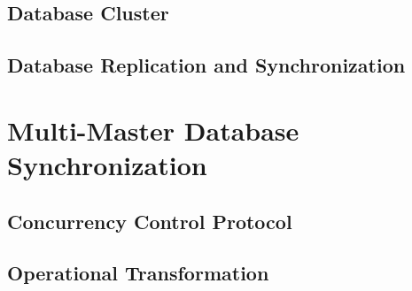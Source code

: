 \subsection{Database Cluster}

\subsection{Database Replication and Synchronization}

\section{Multi-Master Database Synchronization}

\subsection{Concurrency Control Protocol}

\subsection{Operational Transformation}